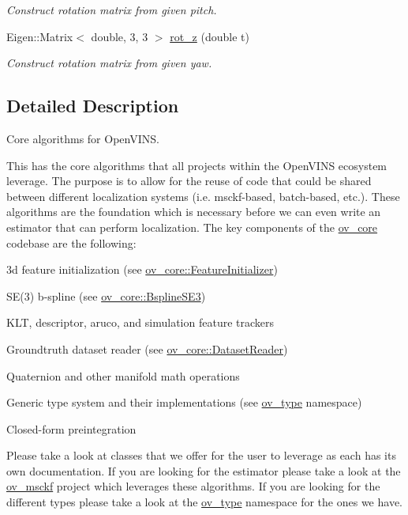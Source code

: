 \begin{DoxyCompactItemize}
\begin{DoxyCompactList}\small\item\em Construct rotation matrix from given pitch. \end{DoxyCompactList}\item 
Eigen\+::\+Matrix$<$ double, 3, 3 $>$ \hyperlink{namespaceov__core_a512a53c9e1519a8e202277db433d37d1}{rot\+\_\+z} (double t)
\begin{DoxyCompactList}\small\item\em Construct rotation matrix from given yaw. \end{DoxyCompactList}\end{DoxyCompactItemize}


\subsection{Detailed Description}
Core algorithms for Open\+V\+I\+NS. 

This has the core algorithms that all projects within the Open\+V\+I\+NS ecosystem leverage. The purpose is to allow for the reuse of code that could be shared between different localization systems (i.\+e. msckf-\/based, batch-\/based, etc.). These algorithms are the foundation which is necessary before we can even write an estimator that can perform localization. The key components of the \hyperlink{namespaceov__core}{ov\+\_\+core} codebase are the following\+:


\begin{DoxyItemize}
\item 3d feature initialization (see \hyperlink{classov__core_1_1FeatureInitializer}{ov\+\_\+core\+::\+Feature\+Initializer})
\item S\+E(3) b-\/spline (see \hyperlink{classov__core_1_1BsplineSE3}{ov\+\_\+core\+::\+Bspline\+S\+E3})
\item K\+LT, descriptor, aruco, and simulation feature trackers
\item Groundtruth dataset reader (see \hyperlink{classov__core_1_1DatasetReader}{ov\+\_\+core\+::\+Dataset\+Reader})
\item Quaternion and other manifold math operations
\item Generic type system and their implementations (see \hyperlink{namespaceov__type}{ov\+\_\+type} namespace)
\item Closed-\/form preintegration \cite{Eckenhoff2019IJRR}
\end{DoxyItemize}

Please take a look at classes that we offer for the user to leverage as each has its own documentation. If you are looking for the estimator please take a look at the \hyperlink{namespaceov__msckf}{ov\+\_\+msckf} project which leverages these algorithms. If you are looking for the different types please take a look at the \hyperlink{namespaceov__type}{ov\+\_\+type} namespace for the ones we have. 

